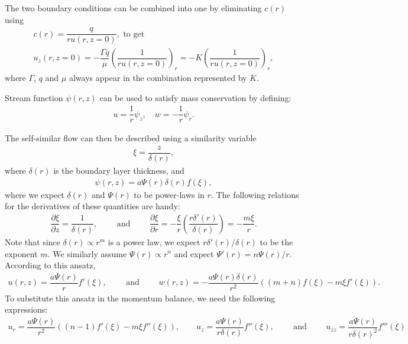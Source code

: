 \documentclass[aps, floatfix, superscriptaddress]{revtex4}
\begin{document}
The two boundary conditions can be combined into one by eliminating $c(r)$ using
\begin{align}
c(r) = \dfrac{q}{r u(r,z=0)}, \text{ to get } \\
u_z(r, z=0) = -\dfrac{\Gamma q}{\mu} \left( \dfrac{1}{r u(r, z=0)} \right)_r = -K \left( \dfrac{1}{r u(r, z=0)} \right)_r,
\end{align}
where $\Gamma$, $q$ and $\mu$ always appear in the combination represented by $K$.

Stream function $\psi(r,z)$ can be used to satisfy mass conservation by defining:
\begin{align}
 u = \dfrac{1}{r} \psi_z, \quad w = -\dfrac{1}{r} \psi_r.
\end{align}

The self-similar flow can then be described using a similarity variable
\begin{align}
 \xi = \dfrac{z}{\delta(r)},
\end{align}
where $\delta(r)$ is the boundary layer thickness, and
\begin{align}
 \psi(r,z) = a \Psi(r) \delta(r) f(\xi),
\end{align}
where we expect $\delta(r)$ and $\Psi(r)$ to be power-laws in $r$. The following relations for the derivatives of these quantities are handy:
\begin{align}
 \dfrac{\partial \xi}{\partial z} = \dfrac{1}{\delta(r)}, \qquad \text{ and }  \qquad \dfrac{\partial \xi}{\partial r} = -\dfrac{\xi}{r} \left( \dfrac{r \delta'(r)}{\delta(r)} \right) = -\dfrac{m \xi}{r}. 
\end{align}
Note that since $\delta(r) \propto r^m$ is a power law, we expect $r\delta'(r)/\delta(r)$ to be the exponent $m$.
We similarly assume $\Psi(r) \propto r^n$ and expect $\Psi'(r) = n\Psi(r)/r$.
According to this ansatz, 
\begin{align}
 u(r,z) = \dfrac{a \Psi(r)}{r} f'(\xi), \qquad \text{ and } \qquad  
 w(r,z) =-\dfrac{a \Psi(r) \delta(r)}{r^2}  \left( (m+n) f(\xi) - {m\xi} f'(\xi)\right).
\end{align}
To substitute this ansatz in the momentum balance, we need the following expressions:
\begin{align}
 u_r = \dfrac{a\Psi(r)}{r^2} \left( (n-1) f'(\xi) - {m \xi} f''(\xi) \right), \qquad 
 u_z = \dfrac{a \Psi(r)}{r \delta(r)} f''(\xi), \qquad \text{ and } \qquad 
 u_{zz} = \dfrac{a \Psi(r)}{r \delta(r)^2} f'''(\xi)
\end{align}
\end{document}
